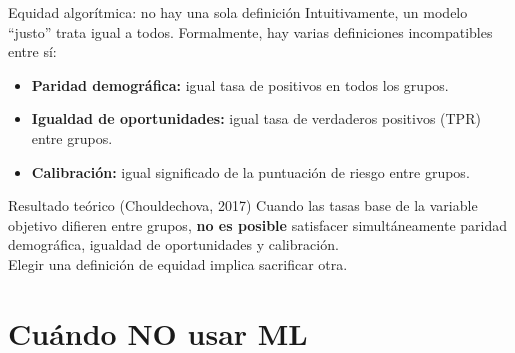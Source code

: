 \documentclass[aspectratio=169]{beamer}
\begin{document}
\begin{frame}{Equidad algorítmica: no hay una sola definición}
  Intuitivamente, un modelo ``justo'' trata igual a todos. Formalmente, hay varias definiciones incompatibles entre sí:

  \bigskip
  \begin{itemize}
    \item \textbf{Paridad demográfica:} igual tasa de positivos en todos los grupos.
    \item \textbf{Igualdad de oportunidades:} igual tasa de verdaderos positivos (TPR) entre grupos.
    \item \textbf{Calibración:} igual significado de la puntuación de riesgo entre grupos.
  \end{itemize}

  \bigskip
  \begin{alertblock}{Resultado teórico (Chouldechova, 2017)}
    Cuando las tasas base de la variable objetivo difieren entre grupos, \textbf{no es posible} satisfacer simultáneamente paridad demográfica, igualdad de oportunidades y calibración.\\
    Elegir una definición de equidad implica sacrificar otra.
  \end{alertblock}
\end{frame}

\section{Cuándo NO usar ML}
\end{document}
